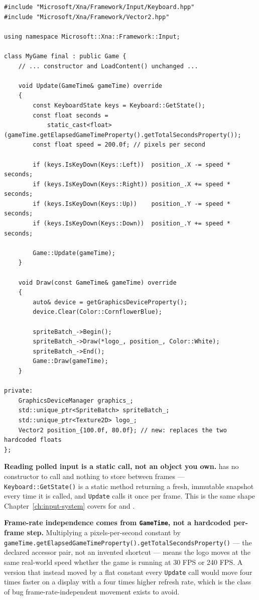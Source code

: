 \begin{lstlisting}
#include "Microsoft/Xna/Framework/Input/Keyboard.hpp"
#include "Microsoft/Xna/Framework/Vector2.hpp"

using namespace Microsoft::Xna::Framework::Input;

class MyGame final : public Game {
    // ... constructor and LoadContent() unchanged ...

    void Update(GameTime& gameTime) override
    {
        const KeyboardState keys = Keyboard::GetState();
        const float seconds =
            static_cast<float>(gameTime.getElapsedGameTimeProperty().getTotalSecondsProperty());
        const float speed = 200.0f; // pixels per second

        if (keys.IsKeyDown(Keys::Left))  position_.X -= speed * seconds;
        if (keys.IsKeyDown(Keys::Right)) position_.X += speed * seconds;
        if (keys.IsKeyDown(Keys::Up))    position_.Y -= speed * seconds;
        if (keys.IsKeyDown(Keys::Down))  position_.Y += speed * seconds;

        Game::Update(gameTime);
    }

    void Draw(const GameTime& gameTime) override
    {
        auto& device = getGraphicsDeviceProperty();
        device.Clear(Color::CornflowerBlue);

        spriteBatch_->Begin();
        spriteBatch_->Draw(*logo_, position_, Color::White);
        spriteBatch_->End();
        Game::Draw(gameTime);
    }

private:
    GraphicsDeviceManager graphics_;
    std::unique_ptr<SpriteBatch> spriteBatch_;
    std::unique_ptr<Texture2D> logo_;
    Vector2 position_{100.0f, 80.0f}; // new: replaces the two hardcoded floats
};
\end{lstlisting}

\textbf{Reading polled input is a static call, not an object you own.}  has
no constructor to call and nothing to store between frames --- \texttt{Keyboard::GetState()}
is a static method returning a fresh, immutable  snapshot every time
it is called, and \texttt{Update} calls it once per frame. This is the same shape
Chapter~\ref{ch:input-system} covers for  and .

\textbf{Frame-rate independence comes from \texttt{GameTime}, not a hardcoded per-frame
step.} Multiplying a pixels-per-second constant by
\texttt{gameTime.get\allowbreak{}ElapsedGameTimeProperty().get\allowbreak{}TotalSecondsProperty()} --- the declared
 accessor pair, not an invented shortcut --- means the logo moves at the
same real-world speed whether the game is running at 30 FPS or 240 FPS. A version that instead
moved by a flat constant every \texttt{Update} call would move four times faster on a display
with a four times higher refresh rate, which is the class of bug frame-rate-independent
movement exists to avoid.

